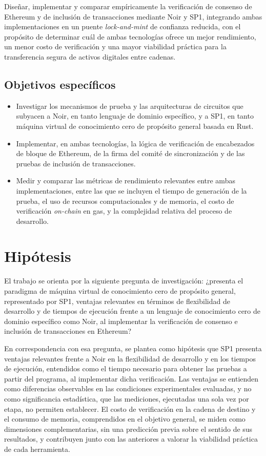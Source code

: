 Diseñar, implementar y comparar empíricamente la verificación de consenso de Ethereum y de
inclusión de transacciones mediante Noir y SP1, integrando ambas implementaciones en un puente
\textit{lock-and-mint} de confianza reducida, con el propósito de determinar cuál de ambas
tecnologías ofrece un mejor rendimiento, un menor costo de verificación y una mayor viabilidad
práctica para la transferencia segura de activos digitales entre cadenas.

\subsection{Objetivos específicos}

\begin{itemize}
	\item Investigar los mecanismos de prueba y las arquitecturas de circuitos que subyacen a
	Noir, en tanto lenguaje de dominio específico, y a SP1, en tanto máquina virtual de
	conocimiento cero de propósito general basada en Rust.
	\item Implementar, en ambas tecnologías, la lógica de verificación de encabezados de bloque
	de Ethereum, de la firma del comité de sincronización y de las pruebas de inclusión de
	transacciones.
	\item Medir y comparar las métricas de rendimiento relevantes entre ambas implementaciones,
	entre las que se incluyen el tiempo de generación de la prueba, el uso de recursos
	computacionales y de memoria, el costo de verificación \textit{on-chain} en gas, y la
	complejidad relativa del proceso de desarrollo.
\end{itemize}

\section{Hipótesis}

El trabajo se orienta por la siguiente pregunta de investigación: ¿presenta el
paradigma de máquina virtual de conocimiento cero de propósito general, representado por SP1,
ventajas relevantes en términos de flexibilidad de desarrollo y de tiempos de ejecución
frente a un lenguaje de conocimiento cero de dominio específico como Noir, al implementar la
verificación de consenso e inclusión de transacciones en Ethereum?

En correspondencia con esa pregunta, se plantea como hipótesis que SP1 presenta ventajas
relevantes frente a Noir en la flexibilidad de desarrollo y en los tiempos de ejecución,
entendidos como el tiempo necesario para obtener las pruebas a partir del programa, al
implementar dicha verificación. Las ventajas se entienden como diferencias observables en las
condiciones experimentales evaluadas, y no como significancia estadística, que las mediciones,
ejecutadas una sola vez por etapa, no permiten establecer. El costo de verificación en la cadena de destino y el consumo de
memoria, comprendidos en el objetivo general, se miden como dimensiones complementarias, sin una
predicción previa sobre el sentido de sus resultados, y contribuyen junto con las anteriores a
valorar la viabilidad práctica de cada herramienta.

